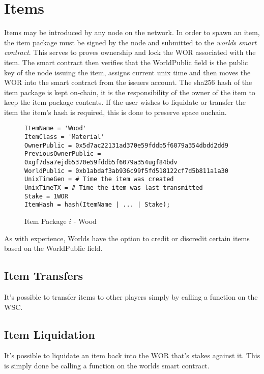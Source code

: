 \documentclass[runningheads,a4paper]{llncs}
\begin{document}
\section{Items} 
\label{items}
Items may be introduced by any node on the network. In order to spawn an item, the item package must be signed by the node and submitted to the \textit{worlds smart contract}. This serves to proves ownership and lock the WOR associated with the item. The smart contract then verifies that the WorldPublic field is the public key of the node issuing the item, assigns current unix time and then moves the WOR into the smart contract from the issuers account. The sha256 hash of the item package is kept on-chain, it is the responsibility of the owner of the item to keep the item package contents. If the user wishes to liquidate or transfer the item the item's hash is required, this is done to preserve space onchain.

\begin{figure}[H]
\centering
\label{itempkg}
\caption{Item Package $i$ - Wood}
\begin{lstlisting}
ItemName = 'Wood'
ItemClass = 'Material'
OwnerPublic = 0x5d7ac22131ad370e59fddb5f6079a354dbdd2dd9
PreviousOwnerPublic = 0xgf7dsa7ejdb5370e59fddb5f6079a354ugf84bdv
WorldPublic = 0xb1abdaf3ab936c99f5fd518122cf7d5b811a1a30
UnixTimeGen = # Time the item was created
UnixTimeTX = # Time the item was last transmitted
Stake = 1WOR
ItemHash = hash(ItemName | ... | Stake);
\end{lstlisting}
\end{figure}

As with experience, Worlds have the option to credit or discredit certain items based on the WorldPublic field.

\subsection{Item Transfers}
It's possible to transfer items to other players simply by calling a function on the WSC.

\subsection{Item Liquidation}
It's possible to liquidate an item back into the WOR that's stakes against it. This is simply done be calling a function on the worlds smart contract.
\end{document}
